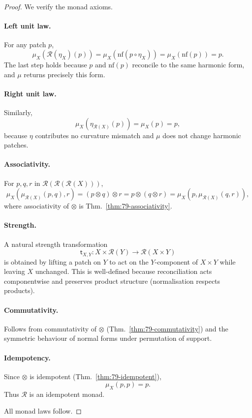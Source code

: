 \begin{proof}
We verify the monad axioms.

\paragraph{Left unit law.}
For any patch $p$,
\[
\mu_X(\mathcal{R}(\eta_X)(p))
  = \mu_X(\mathrm{nf}(p \circ \eta_X))
  = \mu_X(\mathrm{nf}(p))
  = p.
\]
The last step holds because $p$ and $\mathrm{nf}(p)$ reconcile to the same
harmonic form, and $\mu$ returns precisely this form.

\paragraph{Right unit law.}
Similarly,
\[
\mu_X(\eta_{\mathcal{R}(X)}(p))
  = \mu_X(p)
  = p,
\]
because $\eta$ contributes no curvature mismatch and $\mu$ does not change
harmonic patches.

\paragraph{Associativity.}
For $p,q,r$ in $\mathcal{R}(\mathcal{R}(\mathcal{R}(X)))$,
\[
\mu_X(\mu_{\mathcal{R}(X)}(p,q),r)
  = (p \otimes q) \otimes r
  = p \otimes (q \otimes r)
  = \mu_X(p,\mu_{\mathcal{R}(X)}(q,r)),
\]
where associativity of $\otimes$ is
Thm.~\ref{thm:79-associativity}.

\paragraph{Strength.}
A natural strength transformation
\[
\mathsf{t}_{X,Y} : X \times \mathcal{R}(Y) \to \mathcal{R}(X \times Y)
\]
is obtained by lifting a patch on $Y$ to act on the $Y$-component of $X\times Y$
while leaving $X$ unchanged.  
This is well-defined because reconciliation acts componentwise and
preserves product structure (normalisation respects products).

\paragraph{Commutativity.}
Follows from commutativity of $\otimes$ (Thm.~\ref{thm:79-commutativity})
and the symmetric behaviour of normal forms under permutation of support.

\paragraph{Idempotency.}
Since $\otimes$ is idempotent (Thm.~\ref{thm:79-idempotent}),
\[
\mu_X(p,p) = p.
\]
Thus $\mathcal{R}$ is an idempotent monad.

All monad laws follow.
\end{proof}

